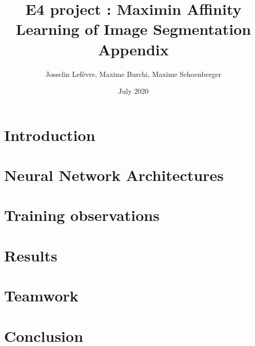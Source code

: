\documentclass{article}
\title{E4 project : Maximin Affinity Learning of Image Segmentation\\Appendix}
\author{Josselin Lefèvre, Maxime Burchi, Maxime Schoenberger}
\date{July 2020}
\begin{document}
\setcounter{tocdepth}{2}
\maketitle
\pagebreak
\tableofcontents
\pagebreak


\section{Introduction}



\section{Neural Network Architectures}



\section{Training observations}


\clearpage

\section{Results}


\clearpage

\section{Teamwork}



\section{Conclusion}



\pagebreak


\end{document}
